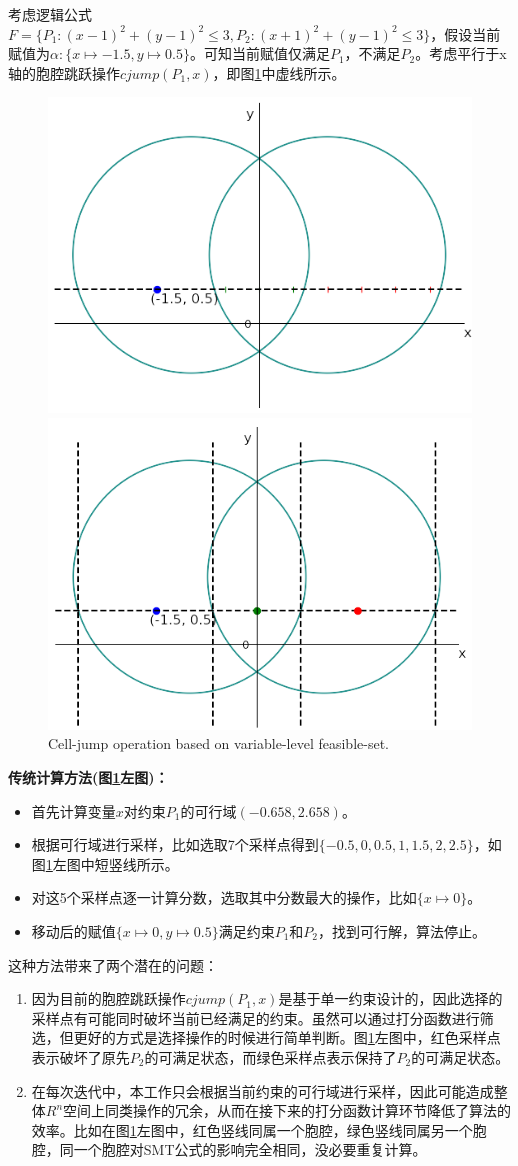 \begin{example}
\label{ex:jump}
考虑逻辑公式$F = \{P_1: (x-1)^2 + (y-1)^2 \leq 3, P_2: (x+1)^2 + (y-1)^2 \leq 3\}$，假设当前赋值为$\alpha: \{x \mapsto -1.5, y \mapsto 0.5\}$。可知当前赋值仅满足$P_1$，不满足$P_2$。考虑平行于x轴的胞腔跳跃操作$cjump(P_1, x)$，即图\ref{fig:jump2}中虚线所示。

\begin{figure}[t]
    \centering
    \includegraphics[width=0.45\columnwidth]{Img/op1.png}\qquad
    \includegraphics[width=0.45\columnwidth]{Img/op2.png}
     {Cell-jump operation based on variable-level feasible-set.}
\label{fig:jump2}
\end{figure}

\textbf{传统计算方法(图\ref{fig:jump2}左图)：}
\begin{itemize}
    \item 首先计算变量$x$对约束$P_1$的可行域$(-0.658, 2.658)$。
    \item 根据可行域进行采样，比如选取7个采样点得到$\{-0.5, 0, 0.5, 1, 1.5, 2, 2.5\}$，如图\ref{fig:jump2}左图中短竖线所示。
    \item 对这5个采样点逐一计算分数，选取其中分数最大的操作，比如$\{x \mapsto 0\}$。
    \item 移动后的赋值$\{x \mapsto 0, y \mapsto 0.5\}$满足约束$P_1$和$P_2$，找到可行解，算法停止。
\end{itemize}

这种方法带来了两个潜在的问题：
\begin{enumerate}
    \item 因为目前的胞腔跳跃操作$cjump(P_1, x)$是基于单一约束设计的，因此选择的采样点有可能同时破坏当前已经满足的约束。虽然可以通过打分函数进行筛选，但更好的方式是选择操作的时候进行简单判断。图\ref{fig:jump2}左图中，红色采样点表示破坏了原先$P_2$的可满足状态，而绿色采样点表示保持了$P_2$的可满足状态。
    \item 在每次迭代中，本工作只会根据当前约束的可行域进行采样，因此可能造成整体$R^n$空间上同类操作的冗余，从而在接下来的打分函数计算环节降低了算法的效率。比如在图\ref{fig:jump2}左图中，红色竖线同属一个胞腔，绿色竖线同属另一个胞腔，同一个胞腔对SMT公式的影响完全相同，没必要重复计算。
\end{enumerate}


\end{example}
